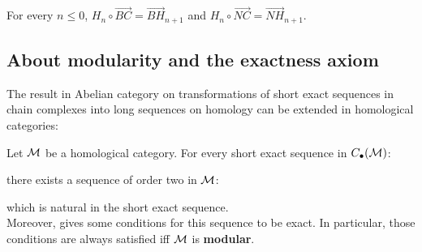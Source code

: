 \begin{prop}
For every $n \leq 0$, $H_n\circ\overrightarrow{BC} = \overrightarrow{BH}_{n+1}$ and $H_n\circ\overrightarrow{NC} = \overrightarrow{NH}_{n+1}$.
\end{prop}
	
	
	\subsection{About modularity and the exactness axiom}
	
	
	The result in Abelian category on transformations of short exact sequences in chain complexes into long sequences on homology can be extended in homological categories:

\begin{theo} 
\label{theo:sod}
Let $\mathcal{M}$ be a homological category. For every short exact sequence in $C_\bullet(\mathcal{M})$:
\begin{center}
\end{center}
there exists a sequence of order two in $\mathcal{M}$: 
\begin{center}
\end{center}
which is natural in the short exact sequence.\\
Moreover, \cite{grandis91b} gives some conditions for this sequence to be exact. In particular, those conditions are always satisfied iff $\mathcal{M}$ is \textbf{modular}.
\end{theo}

